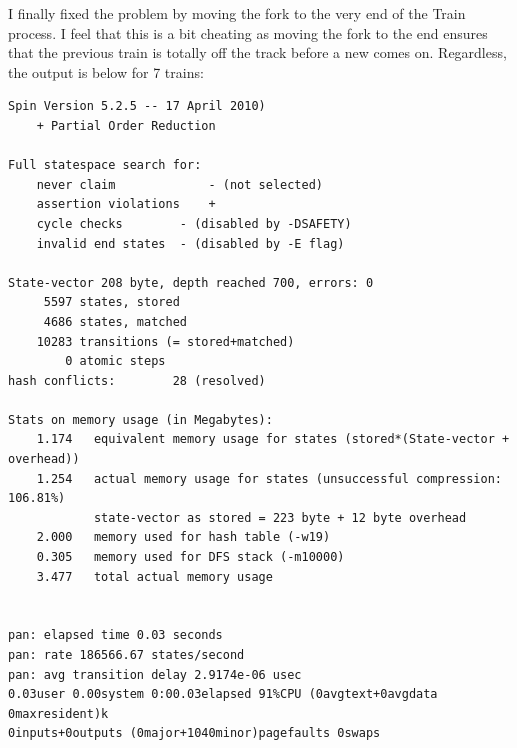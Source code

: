 \documentclass[10pt]{article}
\begin{document}
      I finally fixed the problem by moving the fork to the very end of the
      Train process. I feel that this is a bit cheating as moving the fork to
      the end ensures that the previous train is totally off the track before
      a new comes on. Regardless, the output is below for 7 trains:
      \begin{verbatim}
Spin Version 5.2.5 -- 17 April 2010)
	+ Partial Order Reduction

Full statespace search for:
	never claim         	- (not selected)
	assertion violations	+
	cycle checks       	- (disabled by -DSAFETY)
	invalid end states	- (disabled by -E flag)

State-vector 208 byte, depth reached 700, errors: 0
     5597 states, stored
     4686 states, matched
    10283 transitions (= stored+matched)
        0 atomic steps
hash conflicts:        28 (resolved)

Stats on memory usage (in Megabytes):
    1.174	equivalent memory usage for states (stored*(State-vector + overhead))
    1.254	actual memory usage for states (unsuccessful compression: 106.81%)
         	state-vector as stored = 223 byte + 12 byte overhead
    2.000	memory used for hash table (-w19)
    0.305	memory used for DFS stack (-m10000)
    3.477	total actual memory usage


pan: elapsed time 0.03 seconds
pan: rate 186566.67 states/second
pan: avg transition delay 2.9174e-06 usec
0.03user 0.00system 0:00.03elapsed 91%CPU (0avgtext+0avgdata 0maxresident)k
0inputs+0outputs (0major+1040minor)pagefaults 0swaps
      \end{verbatim} 
\end{document}
